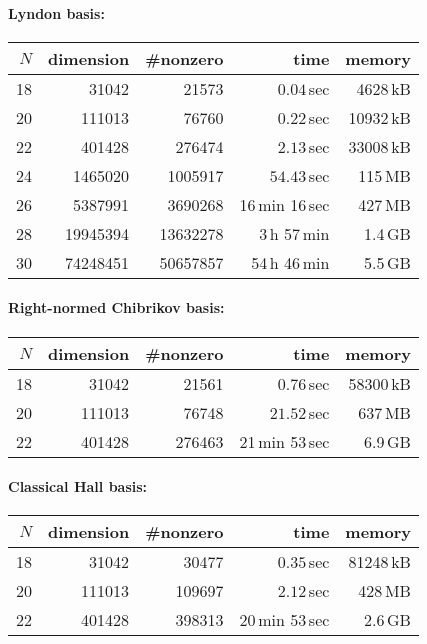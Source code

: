 \documentclass[11pt,a4paper]{article}
\begin{document}
\paragraph{Lyndon basis:}

\nopagebreak

\begin{center}
\begin{tabular}{rrrrr}
\hline
$N$ & dimension & \#nonzero & time  & memory \\
\hline
18 &  31042 & 21573 &  $0.04$\,sec & 4628\,kB\\
20 & 111013 & 76760 & $0.22$\,sec  & 10932\,kB \\
22 & 401428 & 276474 & $2.13$\,sec & 33008\,kB \\
24 & 1465020 & 1005917 & $54.43$\,sec  & 115\,MB\\
26 & 5387991 & 3690268 & 16\,min 16\,sec  &  427\,MB\\
28 & 19945394 & 13632278 & 3\,h 57\,min & 1.4\,GB\\
30 & 74248451 & 50657857 & 54\,h 46\,min & 5.5\,GB\\
\hline
\end{tabular}
\end{center}

\paragraph{Right-normed Chibrikov basis:}
\begin{center}
\begin{tabular}{rrrrr}
\hline
$N$ & dimension & \#nonzero & time  & memory \\
\hline
18 & 31042  & 21561 & $0.76$\,sec & 58300\,kB \\
20 & 111013 & 76748 & $21.52$\,sec & 637\,MB \\
22 & 401428 & 276463 & 21\,min 53\,sec & 6.9\,GB\\
\hline
\end{tabular}
\end{center}

\paragraph{Classical Hall basis:}
\begin{center}
\begin{tabular}{rrrrr}
\hline
$N$ & dimension & \#nonzero & time  & memory \\
\hline
18 & 31042 & 30477   & $0.35$\,sec & 81248\,kB\\
20 & 111013 & 109697 & $2.12$\,sec & 428\,MB \\
22 & 401428 & 398313 & 20\,min 53\,sec & 2.6\,GB\\
\hline
\end{tabular}
\end{center}
\end{document}
